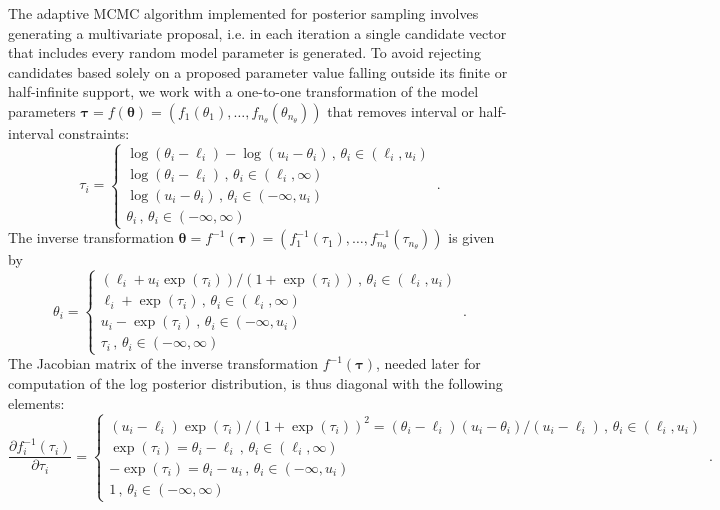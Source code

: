 \documentclass[11pt, oneside]{article}   	%
\begin{document}
\vspace{5mm}

\noindent
The adaptive MCMC algorithm implemented for posterior sampling involves generating a multivariate proposal, i.e. in each iteration a single candidate vector that includes every random model parameter is generated.  To avoid rejecting candidates based solely on a proposed parameter value falling outside its finite or half-infinite support, we work with a one-to-one transformation of the model parameters $\mathbf{\tau} = f(\mathbf{\theta}) = \left( f_1 \left( \theta_1 \right), \ldots, f_{n_\theta} \left( \theta_{n_\theta} \right) \right)$ that removes interval or half-interval constraints:
\[
\tau_i = \left\{ \begin{array}{l}
\log \left( \theta_i - \ell_i \right) - \log \left( u_i - \theta_i \right) \,,\,\theta_i \in (\ell_i, u_i) \\
\log \left( \theta_i - \ell_i \right) \,,\,\theta_i \in (\ell_i, \infty) \\
\log \left( u_i - \theta_i \right) \,,\,\theta_i \in (-\infty, u_i) \\
\theta_i \,,\, \theta_i \in (-\infty, \infty)
\end{array} \right. \,.
\]
The inverse transformation $\mathbf{\theta} = f^{-1}(\mathbf{\tau}) = \left( f_1^{-1} \left( \tau_1 \right), \ldots, f_{n_\theta}^{-1} \left( \tau_{n_\theta} \right) \right)$ is given by
\[
\theta_i = \left\{ \begin{array}{l}
\left( \ell_i + u_i \exp (\tau_i) \right)/\left(1+\exp(\tau_i) \right)\,,\,\theta_i \in (\ell_i, u_i) \\
\ell_i + \exp(\tau_i) \,,\,\theta_i \in (\ell_i, \infty) \\
u_i - \exp(\tau_i) \,,\,\theta_i \in (-\infty, u_i) \\
\tau_i \,,\, \theta_i \in (-\infty, \infty)
\end{array} \right. \,.
\]
The Jacobian matrix of the inverse transformation $f^{-1} (\mathbf{\tau})$, needed later for computation of the log posterior distribution, is thus diagonal with the following elements:
\[
\frac{\partial f_i^{-1} (\tau_i)}{\partial \tau_i} = \left\{ \begin{array}{l}
\left( u_i - \ell_i \right) \exp(\tau_i) /\left(1+\exp(\tau_i) \right)^2 = \left( \theta_i - \ell_i \right) \left( u_i - \theta_i \right) / \left( u_i - \ell_i \right) \,,\,\theta_i \in (\ell_i, u_i) \\
\exp(\tau_i) = \theta_i - \ell_i \,,\,\theta_i \in (\ell_i, \infty) \\
- \exp(\tau_i) = \theta_i - u_i \,,\,\theta_i \in (-\infty, u_i) \\
1 \,,\, \theta_i \in (-\infty, \infty)
\end{array} \right. \,.
\]
\end{document}
